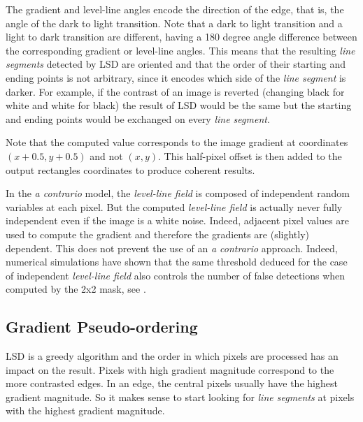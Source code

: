\documentclass{ipol}
\begin{document}
The gradient and level-line angles encode the direction of the edge,
that is, the angle of the dark to light transition. Note that a dark
to light transition and a light to dark transition are different,
having a 180 degree angle difference between the corresponding
gradient or level-line angles. This means that the
resulting \emph{line segments} detected by LSD are oriented and that
the order of their starting and ending points is not arbitrary, since
it encodes which side of the \emph{line segment} is darker. For
example, if the contrast of an image is reverted (changing black for
white and white for black) the result of LSD would be the same but the
starting and ending points would be exchanged on every \emph{line
segment}.

Note that the computed value corresponds to the image gradient at
coordinates $(x+0.5,y+0.5)$ and not $(x,y)$. This half-pixel offset is
then added to the output rectangles coordinates to produce coherent
results.

In the \emph{a contrario} model, the \emph{level-line field} is
composed of independent random variables at each pixel. But the
computed \emph{level-line field} is actually never fully independent
even if the image is a white noise. Indeed, adjacent pixel values are
used to compute the gradient and therefore the gradients are
(slightly) dependent. This does not prevent the use of an \emph{a
contrario} approach. Indeed, numerical simulations have shown that the
same threshold deduced for the case of independent \emph{level-line
field} also controls the number of false detections when computed by
the 2x2 mask, see \cite{multiseg}.


\subsection{Gradient Pseudo-ordering}

LSD is a greedy algorithm and the order in which pixels are processed
has an impact on the result. Pixels with high gradient magnitude
correspond to the more contrasted edges. In an edge, the central
pixels usually have the highest gradient magnitude. So it makes sense
to start looking for \emph{line segments} at pixels with the highest
gradient magnitude.
\end{document}
